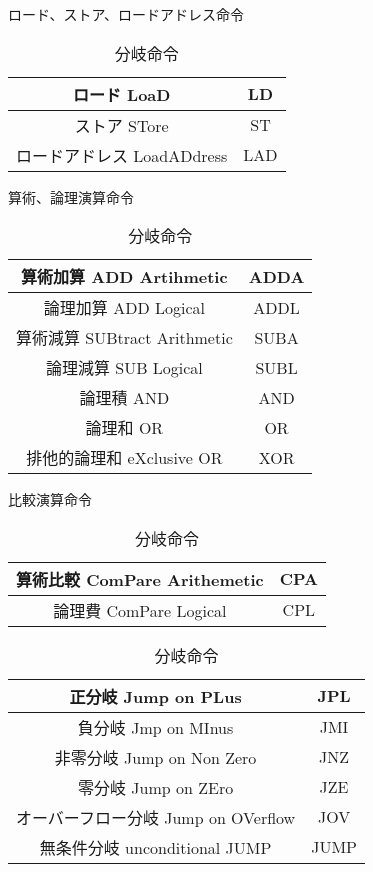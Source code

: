 \documentclass[a4j,uplatex]{jsarticle}
\numberwithin{equation}{section}
\begin{document}
	\begin{table}[htbp]
		\begin{minipage}[c]{0.5\hsize}
			\centering
			\caption{ロード、ストア、ロードアドレス命令}
			\begin{tabular}{|c|c|}
				\hline ロード LoaD & LD \\ \hline
				ストア STore & ST \\ \hline
				ロードアドレス LoadADdress & LAD \\ \hline
			\end{tabular}
		\end{minipage}
		\begin{minipage}[c]{0.5\hsize}
			\centering
			\caption{算術、論理演算命令}
			\begin{tabular}{|c|c|}
				\hline 算術加算 ADD Artihmetic & ADDA \\ \hline
				論理加算 ADD Logical & ADDL \\ \hline
				算術減算 SUBtract Arithmetic & SUBA \\ \hline
				論理減算 SUB Logical & SUBL \\ \hline
				論理積 AND & AND \\ \hline
				論理和 OR & OR \\ \hline
				排他的論理和 eXclusive OR & XOR \\ \hline
			\end{tabular}
		\end{minipage}
		\begin{minipage}[c]{0.5\hsize}
			\centering
			\caption{比較演算命令}
			\begin{tabular}{|c|c|}
				\hline 算術比較 ComPare Arithemetic & CPA \\ \hline
				論理費 ComPare Logical & CPL \\ \hline
			\end{tabular}
		\end{minipage}
		\begin{minipage}[c]{0.5\hsize}
			\centering
			\caption{分岐命令}
			\begin{tabular}{|c|c|}
				\hline 正分岐 Jump on PLus & JPL \\ \hline
				負分岐 Jmp on MInus & JMI \\ \hline
				非零分岐 Jump on Non Zero & JNZ \\ \hline
				零分岐 Jump on ZEro & JZE \\ \hline
				オーバーフロー分岐 Jump on OVerflow & JOV \\ \hline
				無条件分岐 unconditional JUMP & JUMP \\ \hline
			\end{tabular}
		\end{minipage}
	\end{table}
\end{document}
